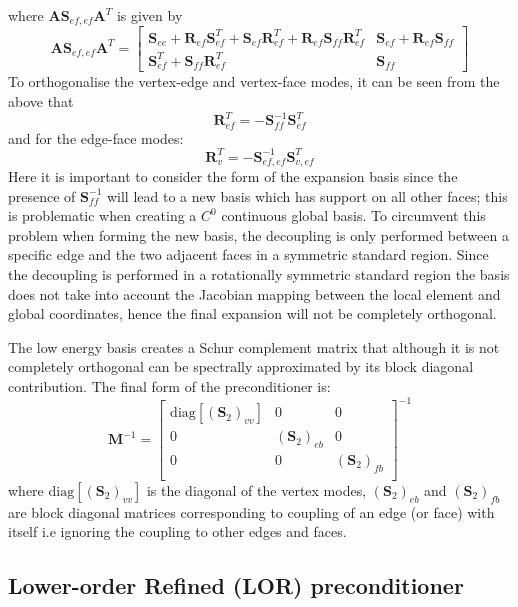 %
where $\mathbf{A}\mathbf{S}_{ef,ef}\mathbf{A}^{T}$ is given by
%
\[
\mathbf{A}\mathbf{S}_{ef,ef}\mathbf{A}^{T}=\left[ \begin{array}{cc}
\mathbf{S}_{ee}+\mathbf{R}_{ef}\mathbf{S}^{T}_{ef}+\mathbf{S}_{ef}\mathbf{R}^{T}_{ef}+\mathbf{R}_{ef}\mathbf{S}_{ff}\mathbf{R}^{T}_{ef} & \mathbf{S}_{ef}+\mathbf{R}_{ef}\mathbf{S}_{ff}\\
\mathbf{S}^{T}_{ef}+\mathbf{S}_{ff}\mathbf{R}^{T}_{ef} & \mathbf{S}_{ff}
 \end{array} \right]
\]
%
To orthogonalise the vertex-edge and vertex-face modes, it can be seen from the
above that
%
\[
\mathbf{R}^{T}_{ef}=-\mathbf{S}^{-1}_{ff}\mathbf{S}^{T}_{ef}
\]
%
and for the edge-face modes:
%
\[
\mathbf{R}^{T}_{v}=-\mathbf{S}^{-1}_{ef,ef}\mathbf{S}^{T}_{v,ef}
\]
%
Here it is important to consider the form of the expansion basis since the
presence of $\mathbf{S}^{-1}_{ff}$ will lead to a new basis which has support on
all other faces; this is problematic when creating a $C^{0}$ continuous global
basis.  To circumvent this problem when forming the new basis, the decoupling is
only performed between a specific edge and the two adjacent faces in a symmetric
standard region. Since the decoupling is performed in a rotationally symmetric
standard region the basis does not take into account the Jacobian mapping
between the local element and global coordinates, hence the final expansion will
not be completely orthogonal.

The low energy basis creates a Schur complement matrix that although it is not
completely orthogonal can be spectrally approximated by its block diagonal
contribution. The final form of the preconditioner is:
%
\[
\mathbf{M}^{-1}=\left[ \begin{array}{ccc}
\mathrm{diag}[(\mathbf{S}_{2})_{vv}] & 0 & 0 \\
0 & (\mathbf{S}_{2})_{eb} & 0\\
0 & 0 & (\mathbf{S}_{2})_{fb}\\
 \end{array} \right]^{-1}
\]
%
where $\mathrm{diag}[(\mathbf{S}_{2})_{vv}]$ is the diagonal of the vertex
modes, $(\mathbf{S}_{2})_{eb}$ and $(\mathbf{S}_{2})_{fb}$ are block diagonal
matrices corresponding to coupling of an edge (or face) with itself i.e ignoring
the coupling to other edges and faces.

\subsection{Lower-order Refined (LOR) preconditioner}


